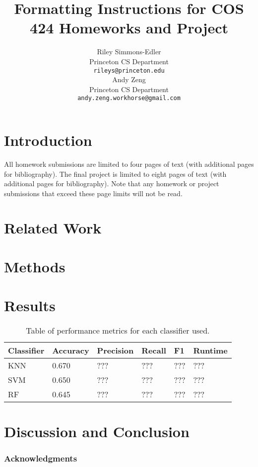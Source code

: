 \documentclass{article} %
\title{Formatting Instructions for COS 424 Homeworks and Project}
\author{
Riley Simmons-Edler\\
Princeton CS Department\\
\texttt{rileys@princeton.edu} \\
\And
Andy Zeng \\
Princeton CS Department \\
\texttt{andy.zeng.workhorse@gmail.com} \\
}
\begin{document}
\maketitle

\begin{abstract}

\end{abstract}

\section{Introduction}

All homework submissions are limited to four pages of text (with additional pages for bibliography). The final project is limited to eight pages of text (with additional pages for bibliography). Note that any homework or project submissions that exceed these page limits will not be read.

\section{Related Work}

\section{Methods}

\section{Results}



\begin{table}[h!]
  \centering
  \caption{Table of performance metrics for each classifier used.}
  \label{tab:performance}
  \begin{tabular}{|l|l|l|l|l|l|}
    \hline
    Classifier & Accuracy & Precision & Recall & F1 & Runtime\\\hline
    KNN & 0.670 & ??? & ??? & ??? & ???\\\hline    
    SVM & 0.650 & ??? & ??? & ??? & ???\\\hline
    RF & 0.645 & ??? & ??? & ??? & ???\\\hline    
  \end{tabular}
\end{table}




\section{Discussion and Conclusion}

\subsubsection*{Acknowledgments}



\end{document}
